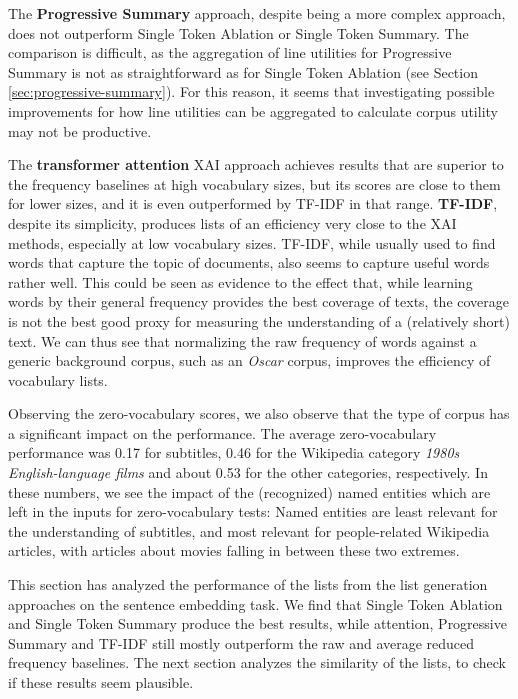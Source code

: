 The \textbf{Progressive Summary} approach, despite being a more complex approach, does not outperform Single Token Ablation or Single Token Summary.
The comparison is difficult, as the aggregation of line utilities for Progressive Summary is not as straightforward as for Single Token Ablation (see Section \ref{sec:progressive-summary}).
For this reason, it seems that investigating possible improvements for how line utilities can be aggregated to calculate corpus utility may not be productive.

The \textbf{transformer attention} XAI approach achieves results that are superior to the frequency baselines at high vocabulary sizes, but its scores are close to them for lower sizes, and it is even outperformed by TF-IDF in that range.
\textbf{TF-IDF}, despite its simplicity, produces lists of an efficiency very close to the XAI methods, especially at low vocabulary sizes.
TF-IDF, while usually used to find words that capture the topic of documents, also seems to capture useful words rather well.
This could be seen as evidence to the effect that, while learning words by their general frequency provides the best coverage of texts, the coverage is not the best good proxy for measuring the understanding of a (relatively short) text.
We can thus see that normalizing the raw frequency of words against a generic background corpus, such as an \textit{Oscar} corpus, improves the efficiency of vocabulary lists.

Observing the zero-vocabulary scores, we also observe that the type of corpus has a significant impact on the performance.
The average zero-vocabulary performance was 0.17 for subtitles, 0.46 for the Wikipedia category \textit{1980s English-language films} and about 0.53 for the other categories, respectively.
In these numbers, we see the impact of the (recognized) named entities which are left in the inputs for zero-vocabulary tests:
Named entities are least relevant for the understanding of subtitles, and most relevant for people-related Wikipedia articles, with articles about movies falling in between these two extremes.

This section has analyzed the performance of the lists from the list generation approaches on the sentence embedding task.
We find that Single Token Ablation and Single Token Summary produce the best results, while attention, Progressive Summary and TF-IDF still mostly outperform the raw and average reduced frequency baselines.
The next section analyzes the similarity of the lists, to check if these results seem plausible.

